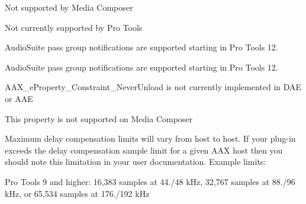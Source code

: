 \begin{DoxyRefList}
Not supported by Media Composer 
\item[\label{a00381__compatibility_notes000026}%
\hypertarget{a00381__compatibility_notes000026}{}%
global\+Scope$>$ Member \hyperlink{a00206_a86f7310877399d9d4d2ea4863d472476a2524774deef9e82058134126dc729a5a}{A\+A\+X\+\_\+e\+Plug\+In\+Strings\+\_\+\+Progress} ]Not currently supported by Pro Tools 
\item[\label{a00381__compatibility_notes000047}%
\hypertarget{a00381__compatibility_notes000047}{}%
global\+Scope$>$ Member \hyperlink{a00206_a6ec854be40c8cf810dec97de3e56c0a7a1fb443ff62601d3e5f5562a4af8edf41}{A\+A\+X\+\_\+e\+Processing\+State\+\_\+\+Begin\+Pass\+Group} ]Audio\+Suite pass group notifications are supported starting in Pro Tools 12.  
\item[\label{a00381__compatibility_notes000046}%
\hypertarget{a00381__compatibility_notes000046}{}%
global\+Scope$>$ Member \hyperlink{a00206_a6ec854be40c8cf810dec97de3e56c0a7a6c7dcf22600f9fe8a6113dbd5ffd1605}{A\+A\+X\+\_\+e\+Processing\+State\+\_\+\+End\+Pass\+Group} ]Audio\+Suite pass group notifications are supported starting in Pro Tools 12.  
\item[\label{a00381__compatibility_notes000068}%
\hypertarget{a00381__compatibility_notes000068}{}%
global\+Scope$>$ Member \hyperlink{a00283_a6571f4e41a5dd06e4067249228e2249ea734930f534d7af40835db1b12afb209e}{A\+A\+X\+\_\+e\+Property\+\_\+\+Constraint\+\_\+\+Never\+Unload} ]A\+A\+X\+\_\+e\+Property\+\_\+\+Constraint\+\_\+\+Never\+Unload is not currently implemented in D\+A\+E or A\+A\+E  
\item[\label{a00381__compatibility_notes000066}%
\hypertarget{a00381__compatibility_notes000066}{}%
global\+Scope$>$ Member \hyperlink{a00283_a6571f4e41a5dd06e4067249228e2249eadd8839e5678c8880215e318197cc8d3a}{A\+A\+X\+\_\+e\+Property\+\_\+\+Destination\+Track} ]This property is not supported on Media Composer 
\item[\label{a00381__compatibility_notes000062}%
\hypertarget{a00381__compatibility_notes000062}{}%
global\+Scope$>$ Member \hyperlink{a00283_a6571f4e41a5dd06e4067249228e2249eaa9037ffd2caf892bafe8f7f170548cb4}{A\+A\+X\+\_\+e\+Property\+\_\+\+Latency\+Contribution} ]Maximum delay compensation limits will vary from host to host. If your plug-\/in exceeds the delay compensation sample limit for a given A\+A\+X host then you should note this limitation in your user documentation. Example limits\+:
\begin{DoxyItemize}
\item Pro Tools 9 and higher\+: 16,383 samples at 44./48 k\+Hz, 32,767 samples at 88./96 k\+Hz, or 65,534 samples at 176./192 k\+Hz

\end{DoxyItemize}
\end{DoxyRefList}
